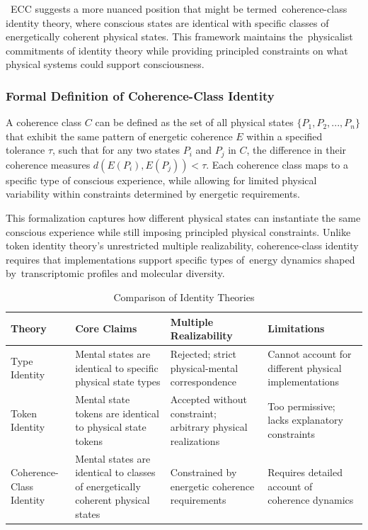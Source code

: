~ECC suggests a more nuanced position that might be termed~coherence-class identity theory, where conscious states are identical with specific classes of energetically coherent physical states. This framework maintains the~physicalist commitments of identity theory while providing principled constraints on what physical systems could support consciousness.

\subsubsection{Formal Definition of Coherence-Class Identity}

A coherence class $C$ can be defined as the set of all physical states $\{P_1, P_2, ..., P_n\}$ that exhibit the same pattern of energetic coherence $E$ within a specified tolerance $\tau$, such that for any two states $P_i$ and $P_j$ in $C$, the difference in their coherence measures $d(E(P_i), E(P_j)) < \tau$. Each coherence class maps to a specific type of conscious experience, while allowing for limited physical variability within constraints determined by energetic requirements.

This formalization captures how different physical states can instantiate the same conscious experience while still imposing principled physical constraints. Unlike token identity theory's unrestricted multiple realizability, coherence-class identity requires that implementations support specific types of~energy dynamics shaped by~transcriptomic profiles and molecular diversity.

\begin{table}[h]
    \centering
    \caption{Comparison of Identity Theories}
    \begin{tabular}{|p{2.5cm}|p{3cm}|p{3cm}|p{3cm}|}
        \hline
        \textbf{Theory}          & \textbf{Core Claims}                                                             & \textbf{Multiple Realizability}                              & \textbf{Limitations}                                  \\
        \hline
        Type Identity            & Mental states are identical to specific physical state types                     & Rejected; strict physical-mental correspondence              & Cannot account for different physical implementations \\
        \hline
        Token Identity           & Mental state tokens are identical to physical state tokens                       & Accepted without constraint; arbitrary physical realizations & Too permissive; lacks explanatory constraints         \\
        \hline
        Coherence-Class Identity & Mental states are identical to classes of energetically coherent physical states & Constrained by energetic coherence requirements              & Requires detailed account of coherence dynamics       \\
        \hline
    \end{tabular}
\end{table}

